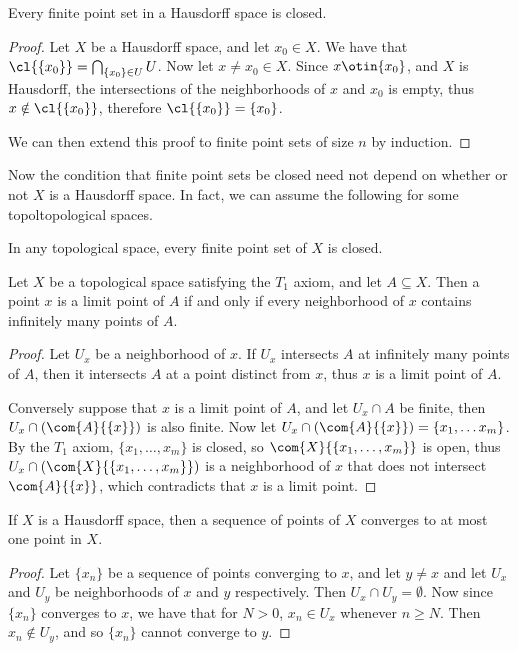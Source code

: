\begin{theorem}\label{1.6.8}
    Every finite point set in a Hausdorff space is closed.
\end{theorem}
\begin{proof}
    Let $X$ be a Hausdorff space, and let  $x_0 \in X$. We have that
    $\cl{\{x_0\}}=\bigcap_{\{x_0\} \in U}{U}$. Now let $x \neq x_0 \in X$.
    Since $x \otin \{x_0\}$, and $X$ is Hausdorff, the intersections of the
    neighborhoods of $x$ and  $ x_0$ is empty, thus $x \notin \cl{\{x_0\}}$,
    therefore $\cl{\{x_0\}}=\{x_0\}$.

    We can then extend this proof to finite point sets of size $n$ by induction.
\end{proof}

Now the condition that finite point sets be closed need not depend on whether or
not $X$ is a Hausdorff space. In fact, we can assume the following for some
topoltopological spaces.

\begin{axiom}\label{axm1.6.1}
    In any topological space, every finite point set of $X$ is closed.
\end{axiom}

\begin{theorem}\label{1.6.9}
    Let $X$ be a topological space satisfying the $ T_1$ axiom, and let $A
    \subseteq X$. Then a point  $x$ is a limit point of  $A$ if and only if
    every neighborhood of  $x$ contains infinitely many points of  $A$.
\end{theorem}
\begin{proof}
    Let $U_x$ be a neighborhood of  $x$. If  $U_x$ intersects $A$ at infinitely
    many points of  $A$, then it intersects  $A$ at a point distinct from  $x$,
    thus  $x$ is a limit point of  $A$.

    Conversely suppose that  $x$ is a limit point of  $A$, and let  $U_x \cap A$
    be finite, then  $U_x \cap (\com{A}{\{x\}})$ is also  finite. Now let
    $U_x \cap (\com{A}{\{x\}})=\{x_1, \dots x_m\}$. By the $T_1$ axiom,
    $\{x_1, \dots, x_m\}$ is closed, so $\com{X}{\{x_1, \dots, x_m\}}$ is open,
    thus $U_x \cap (\com{X}{\{x_1, \dots, x_m\}})$ is a neighborhood of $x$ that
    does not intersect  $\com{A}{\{x\}}$, which contradicts that  $x$ is a
    limit point.
\end{proof}

\begin{theorem}\label{1.6.10}
    If $X$ is a Hausdorff space, then a sequence of points of  $X$ converges to
    at most one point in  $X$.
\end{theorem}
\begin{proof}
    Let $\{x_n\}$ be a sequence of points converging to $x$, and let  $y \neq x$
    and let  $U_x$ and  $U_y$ be neighborhoods of  $x$ and  $y$ respectively.
    Then $U_x \cap U_y = \emptyset$. Now since  $\{x_n\}$ converges to  $x$, we
    have that for $N>0$, $x_n \in U_x$ whenever $n \geq N$. Then $x_n \notin
    U_y$, and so  $\{x_n\}$ cannot converge to  $y$.
\end{proof}

